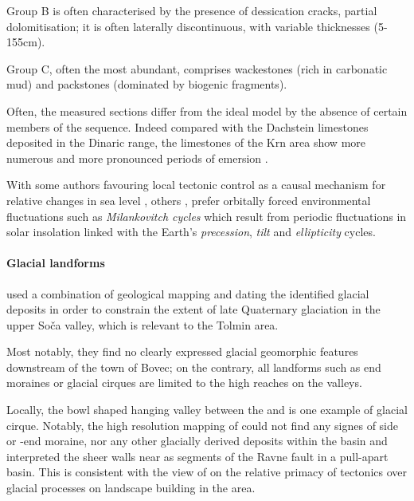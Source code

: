 Group B is often characterised by the presence of dessication cracks, partial dolomitisation; it is often laterally discontinuous, with variable thicknesses (5-155cm).

Group C, often the most abundant, comprises wackestones (rich in carbonatic mud) and packstones (dominated by biogenic fragments).


Often, the measured sections differ from the ideal model by the absence of certain members of the sequence. Indeed compared with the Dachstein limestones deposited in the Dinaric range, the limestones of the Krn area show more numerous and more pronounced periods of emersion \citep{ogorelec1996dachstein}.

 With some authors favouring local tectonic control as a causal mechanism  for relative changes in sea level \citep{goldhammer1990depositional,enos1998lofer}, others \citep{fisher1964lofer,balog1997shallow,haas2004characteristics,doi:10.1130/G21578.1}, prefer orbitally forced environmental fluctuations such as \emph{Milankovitch cycles} which result from periodic fluctuations in solar insolation linked with the Earth's \emph{precession}, \emph{tilt} and \emph{ellipticity} cycles. 

 \paragraph{Glacial landforms}
 \citet{bavec2004late} used a combination of geological mapping and dating the identified glacial deposits in order to constrain the extent of late Quaternary glaciation in the upper So\v{c}a valley, which is relevant to the Tolmin area.

 Most notably, they find no clearly expressed glacial geomorphic features downstream of the town of Bovec; on the contrary, all landforms such as end moraines or glacial cirques are limited to the high reaches on the valleys. 

Locally, the bowl shaped hanging valley between the  and  is one example of glacial cirque. Notably, the high resolution mapping of \citet{cunningham2006application} could not find any signes of side or -end moraine, nor any other glacially derived deposits within the  basin and interpreted the sheer walls near  as segments of the Ravne fault in a pull-apart basin. 
This is consistent with the view of \citet{vsmuc2009tectonic} on the relative primacy of tectonics over glacial processes on landscape building in the  area.


